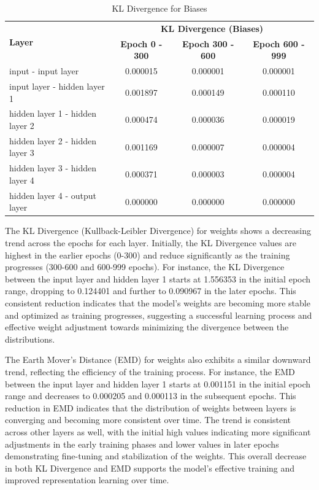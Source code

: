 \documentclass{ioereport}
\begin{document}
    \begin{table}[H]
    \centering
    \begin{tabular}{|l|c|c|c|}
    \hline
    \multirow{2}{*}{\textbf{Layer}} & \multicolumn{3}{|c|}{\textbf{KL Divergence (Biases)}} \\
    \cline{2-4}
    & \textbf{Epoch 0 - 300} & \textbf{Epoch 300 - 600} & \textbf{Epoch 600 - 999} \\
    \hline
    input - input layer & 0.000015 & 0.000001 & 0.000001 \\
    input layer - hidden layer 1 & 0.001897 & 0.000149 & 0.000110 \\
    hidden layer 1 - hidden layer 2 & 0.000474 & 0.000036 & 0.000019 \\
    hidden layer 2 - hidden layer 3 & 0.001169 & 0.000007 & 0.000004 \\
    hidden layer 3 - hidden layer 4 & 0.000371 & 0.000003 & 0.000004 \\
    hidden layer 4 - output layer & 0.000000 & 0.000000 & 0.000000 \\
    \hline
    \end{tabular}
    \caption{KL Divergence for Biases}
    \end{table}

    
    The KL Divergence (Kullback-Leibler Divergence) for weights shows a decreasing trend across the epochs for each layer. Initially, the KL Divergence values are highest in the earlier epochs (0-300) and reduce significantly as the training progresses (300-600 and 600-999 epochs). For instance, the KL Divergence between the input layer and hidden layer 1 starts at 1.556353 in the initial epoch range, dropping to 0.124401 and further to 0.090967 in the later epochs. This consistent reduction indicates that the model's weights are becoming more stable and optimized as training progresses, suggesting a successful learning process and effective weight adjustment towards minimizing the divergence between the distributions.

    The Earth Mover's Distance (EMD) for weights also exhibits a similar downward trend, reflecting the efficiency of the training process. For instance, the EMD between the input layer and hidden layer 1 starts at 0.001151 in the initial epoch range and decreases to 0.000205 and 0.000113 in the subsequent epochs. This reduction in EMD indicates that the distribution of weights between layers is converging and becoming more consistent over time. The trend is consistent across other layers as well, with the initial high values indicating more significant adjustments in the early training phases and lower values in later epochs demonstrating fine-tuning and stabilization of the weights. This overall decrease in both KL Divergence and EMD supports the model's effective training and improved representation learning over time.
\end{document}
